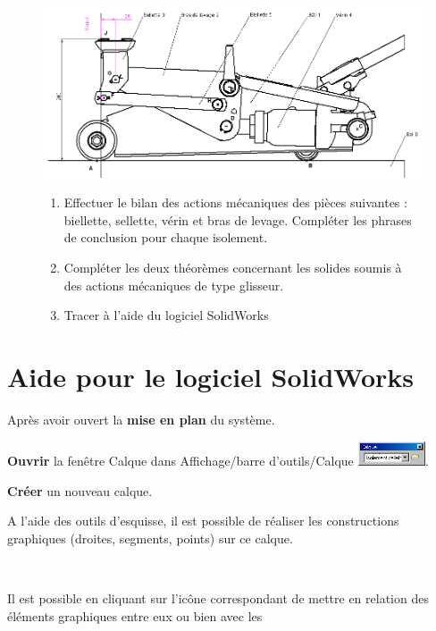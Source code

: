 \begin{figure}
 \begin{minipage}{0.38\linewidth}
 \centering\includegraphics[width=1\linewidth]{img/cric-014.png}
 \end{minipage}
 \hfill
 \begin{minipage}{0.6\linewidth}
 \begin{enumerate}
 \item Effectuer le bilan des actions mécaniques des pièces suivantes : biellette, sellette, vérin et bras de levage. Compléter les phrases de conclusion pour chaque isolement. 
 \item Compléter les deux théorèmes concernant les solides soumis à des actions mécaniques de type glisseur. 
 \item Tracer à l'aide du logiciel SolidWorks 
 \end{enumerate}
 \end{minipage}
\end{figure}

\section{Aide pour le logiciel SolidWorks}


Après avoir ouvert la \textbf{mise en plan} du système.

\textbf{Ouvrir} la fenêtre Calque dans Affichage/barre d'outils/Calque  \includegraphics[width=2cm]{img/calque.png}.

\textbf{Créer} un nouveau calque.


A l'aide des outils d'esquisse, il est possible de réaliser les constructions graphiques (droites, segments, points) sur ce calque.

~\

Il est possible en cliquant sur l'icône correspondant de mettre en relation des éléments graphiques entre eux ou bien avec les 

